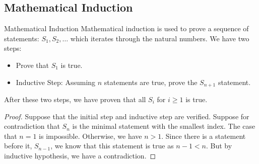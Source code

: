 \documentclass{report}
\begin{document}
\begin{topic}
    \section{Mathematical Induction}
\end{topic}

\begin{definition}{Mathematical Induction}
    Mathematical induction is used to prove a sequence of statements: $S_{1}, S_{2}, \ldots$ which iterates through the natural numbers. We have two steps:
        \begin{itemize}
            \item Prove that $S_{1}$ is true.

            \item Inductive Step: Assuming $n$ statements are true, prove the $S_{n + 1}$ statement. 
        \end{itemize}
    After these two steps, we have proven that all $S_{i}$ for $i \geq 1$ is true.
\end{definition}
    \begin{proof}
        Suppose that the initial step and inductive step are verified. Suppose for contradiction that $S_{n}$ is the minimal statement with the smallest index. The case that $n = 1$ is impossible. Otherwise, we have $n > 1$. Since there is a statement before it, $S_{n - 1}$, we know that this statement is true as $n - 1 < n$. But by inductive hypothesis, we have a contradiction.
    \end{proof}
\end{document}
